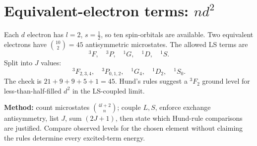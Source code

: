 
\section{Equivalent-electron terms: \(nd^2\)}
Each \(d\) electron has \(l=2\), \(s=\frac12\), so ten
spin-orbitals are available. Two equivalent electrons
have \(\binom{10}{2}=45\) antisymmetric microstates.
The allowed LS terms are
\[
{}^3F,\quad{}^3P,\quad{}^1G,\quad{}^1D,\quad{}^1S.
\]
Split into \(J\) values:
\[
{}^3F_{2,3,4},\quad{}^3P_{0,1,2},\quad
{}^1G_4,\quad{}^1D_2,\quad{}^1S_0.
\]
The check is \(21+9+9+5+1=45\).
Hund's rules suggest a \({}^3F_2\) ground level for less-than-half-filled
\(d^2\) in the LS-coupled limit.
\begin{methodbox}
\textbf{Method:} count microstates \(\binom{4l+2}{n}\);
couple \(L,S\), enforce exchange antisymmetry, list \(J\),
sum \((2J+1)\), then state which Hund-rule comparisons are justified.
Compare observed levels for the chosen element without claiming
the rules determine every excited-term energy.
\end{methodbox}
